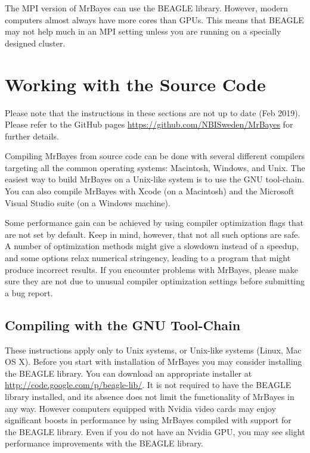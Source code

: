 \documentclass[12pt]{book}
\begin{document}
The MPI version of MrBayes can use the BEAGLE library. However, modern computers almost always have
more cores than GPUs. This means that BEAGLE may not help much in an MPI setting unless you are
running on a specially designed cluster.


\section{Working with the Source Code}
\vspace{5 pt}
{\large Please note that the instructions in these sections are not up to date
(Feb 2019). Please refer to the GitHub pages \url{https://github.com/NBISweden/MrBayes}
for further details.}
\vspace{5 pt}

Compiling MrBayes from source code can be done with several different compilers targeting all the
common operating systems: Macintosh, Windows, and Unix. The easiest way to build MrBayes on a
Unix-like system is to use the GNU tool-chain. You can also compile MrBayes with Xcode (on a
Macintosh) and the Microsoft Visual Studio suite (on a Windows machine).

Some performance gain can be achieved by using compiler optimization flags that are not set by
default.  Keep in mind, however, that not all such options are safe. A number of optimization
methods might give a slowdown instead of a speedup, and some options relax numerical stringency,
leading to a program that might produce incorrect results. If you encounter problems with MrBayes,
please make sure they are not due to unusual compiler optimization settings before submitting a bug
report.

\subsection{Compiling with the GNU Tool-Chain}
These instructions apply only to Unix systems, or Unix-like systems (Linux, Mac OS X). Before you
start with installation of MrBayes you may consider installing the BEAGLE library. You can download
an appropriate installer at \url{http://code.google.com/p/beagle-lib/}. It is not required to have
the BEAGLE library installed, and its absence does not limit the functionality of MrBayes in any
way. However computers equipped with Nvidia video cards may enjoy significant boosts in performance
by using MrBayes compiled with support for the BEAGLE library. Even if you do not have an Nvidia
GPU, you may see slight performance improvements with the BEAGLE library.  
\end{document}
